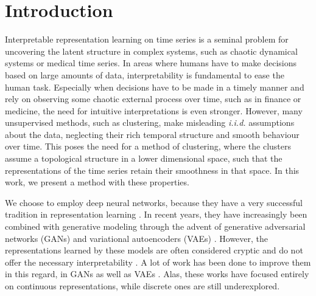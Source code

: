 \section{Introduction}


Interpretable representation learning on time series is a seminal problem for uncovering the latent structure in complex systems, such as chaotic dynamical systems or medical time series.
In areas where humans have to make decisions based on large amounts of data, interpretability is fundamental to ease the human task.
Especially when decisions have to be made in a timely manner and rely on observing some chaotic external process over time, such as in finance or medicine, the need for intuitive interpretations is even stronger.
However, many unsupervised methods, such as clustering, make misleading \emph{i.i.d.} assumptions about the data, neglecting their rich temporal structure and smooth behaviour over time.
This poses the need for a method of clustering, where the clusters assume a topological structure in a lower dimensional space, such that the representations of the time series retain their smoothness in that space.
In this work, we present a method with these properties.

We choose to employ deep neural networks, because they have a very successful tradition in representation learning \citep{Bengio2012}.
In recent years, they have increasingly been combined with generative modeling through the advent of generative adversarial networks (GANs) \citep{Goodfellow2014} and variational autoencoders (VAEs) \citep{Kingma2013}.
However, the representations learned by these models are often considered cryptic and do not offer the necessary interpretability \citep{Chen2016a}.
A lot of work has been done to improve them in this regard, in GANs \citep{Chen2016a} as well as VAEs \citep{Higgins2017, Esmaeili2018}.
Alas, these works have focused entirely on continuous representations, while discrete ones are still underexplored.

